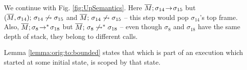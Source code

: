We continue with  Fig. \ref{fig:UpSemantics}. Here $\overline{M};\sigma_{14}\! \rightarrow\! {\sigma_{15}}$ 
 but    $(\overline{M}, \sigma_{14});\, {\sigma_{14}} \not\rightsquigarrow \sigma_{15}$
and  $\overline{M};\, {\sigma_{14}} \not\rightsquigarrow \sigma_{15}$
--  this step would pop  $\sigma_{14}$'s
 top frame. 
 Also, $\overline{M};\sigma_8\! \rightarrow^*\! {\sigma_{18}}$ 
 but  $\overline{M};\, {\sigma_8} \not\rightsquigarrow^* \sigma_{18}$  -- even though $\sigma_8$ and $\sigma_{18}$ have the same depth of stack, they belong to different calls.

  
Lemma \ref{lemma:orig:to:bounded}  states that
 which is part of an execution which started at some initial state, is scoped by that state.
